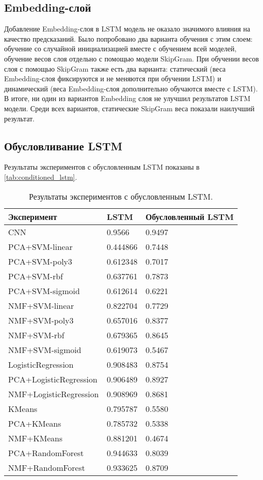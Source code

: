 \subsection{Embedding-слой}

Добавление Embedding-слоя в LSTM модель не оказало значимого влияния на качество предсказаний. Было попробовано два варианта обучения с этим слоем: обучение со случайной инициализацией вместе с обучением всей моделей, обучение весов слоя отдельно с помощью модели SkipGram. При обучении весов слоя с помощью SkipGram также есть два варианта: статический (веса Embedding-слоя фиксируются и не меняются при обучении LSTM) и динамический (веса Embedding-слоя дополнительно обучаются вместе с LSTM).\\
В итоге, ни один из вариантов Embedding слоя не улучшил результатов LSTM модели. Среди всех вариантов, статические SkipGram веса показали наилучший результат.

\subsection{Обусловливание LSTM}

Результаты экспериментов с обусловленным LSTM показаны в \autoref{tab:conditioned_lstm}.

\begin{table}[H]
	\centering
	\begin{tabular}{ |p{6cm}||p{3cm}|p{3cm}| }
	 \hline
	 \rowfont{\scriptsize}%
	 \textbf{Эксперимент} & \rowfont{\scriptsize}\textbf{LSTM} & \rowfont{\scriptsize}\textbf{Обусловленный LSTM}\\
	 \hline\hline
	 \rowfont{\normalsize}%
	CNN & 0.9566 & 0.9497\\
	\hline
	PCA+SVM-linear & 0.444866 & 0.7448\\
	PCA+SVM-poly3 & 0.612348 & 0.7017\\
	PCA+SVM-rbf & 0.637761 & 0.7873\\
	PCA+SVM-sigmoid & 0.612614 & 0.6221\\
	\hline
	NMF+SVM-linear & 0.822704 & 0.7729\\
	NMF+SVM-poly3 & 0.657016 & 0.8377\\
	NMF+SVM-rbf & 0.679365 & 0.8645\\
	NMF+SVM-sigmoid & 0.619073 & 0.5467\\
	\hline
	LogisticRegression & 0.908483 & 0.8754 \\
	PCA+LogisticRegression & 0.906489 & 0.8927 \\
	NMF+LogisticRegression & 0.908969 & 0.8681 \\
	\hline
	KMeans & 0.795787 & 0.5580 \\
	PCA+KMeans & 0.785732 & 0.5338 \\
	NMF+KMeans & 0.881201 & 0.4674 \\
	\hline
	PCA+RandomForest & 0.944633 & 0.8039 \\
	NMF+RandomForest & 0.933625 & 0.8709 \\
	\hline
	\end{tabular}
	\caption{Результаты экспериментов с обусловленным LSTM.}
	\label{tab:conditioned_lstm}
	\end{table}
